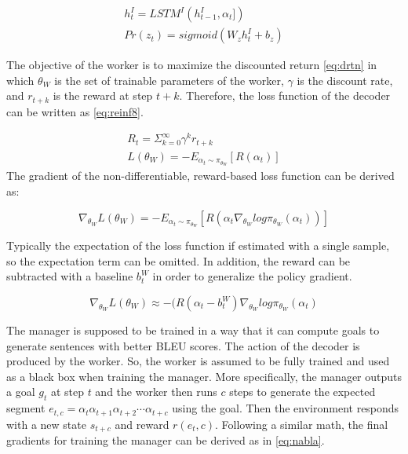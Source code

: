 \documentclass[preprint, 12pt]{elsarticle}
\begin{document}
		\begin{align}
			h_t^I = LSTM^I(h_{t-1}^I, \alpha_t]) \label{eq:reinf6} \\
			Pr(z_t) = sigmoid(W_zh_t^I + b_z) \label{eq:reinf7} 
		\end{align}
		
		The objective of the worker is to maximize the discounted return \eqref{eq:drtn} in which $\theta_W$ is the set of trainable parameters of the worker, $\gamma$ is the discount rate, and $r_{t+k}$ is the reward at step $t+k$. Therefore, the loss function of the decoder can be written as \eqref{eq:reinf8}.
		
		\begin{align}
			R_t = \Sigma_{k=0}^\infty \gamma^k r_{t+k} \label{eq:drtn} \\
			L(\theta_W) = -E_{\alpha_t \sim \pi_{\theta_W}}[R(\alpha_t)] \label{eq:reinf8}		
		\end{align}
		The gradient of the non-differentiable, reward-based loss function can be derived as:
		
		\begin{equation}
			\nabla_{\theta_W} L(\theta_W) = - E_{\alpha_t \sim \pi_{\theta_W}} [R(\alpha_t \nabla_{\theta_W} log \pi_{\theta_W}(\alpha_t))]
		\end{equation}
		
		Typically the expectation of the loss function if estimated with a single sample, so the expectation term can be omitted. In addition, the reward can be subtracted with a baseline $b_t^W$ in order to generalize the policy gradient.
		
		\begin{equation}
			\nabla_{\theta_W} L(\theta_W) \approx -(R(\alpha_t - b_t^W) \nabla_{\theta_W} log \pi_{\theta_W} (\alpha_t)
		\end{equation}
		
		The manager is supposed to be trained in a way that it can compute goals to generate sentences with better BLEU scores. The action of the decoder is produced by the worker. So, the worker is assumed to be fully trained and used as a black box when training the manager. More specifically, the manager outputs a goal $g_t$ at step $t$ and the worker then runs $c$ steps to generate the expected segment $e_{t, c} = \alpha_t \alpha_{t+1} \alpha_{t+2} \cdots \alpha_{t+c}$ using the goal. Then the environment responds with a new state $s_{t+c}$ and reward $r(e_t, c)$. Following a similar math, the final gradients for training the manager can be derived as in \eqref{eq:nabla}.
		
\end{document}
